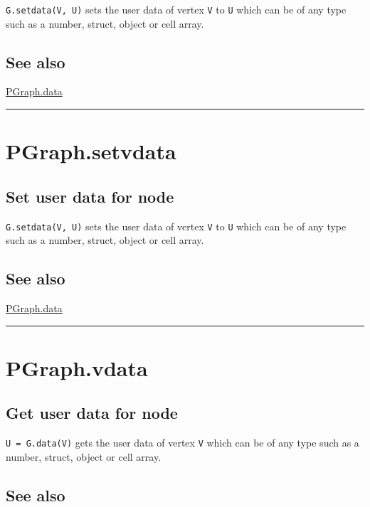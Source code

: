 \texttt{G.setdata(V, U)} sets the user data of vertex \texttt{V} to \texttt{U} which can be of any
type such as a number, struct, object or cell array.


\subsection*{See also}


\hyperlink{PGraph.data}{\color{blue} PGraph.data}

\vspace{1.5ex}\hrule

\hypertarget{PGraph.setvdata}{\section*{PGraph.setvdata}}
\subsection*{Set user data for node}


\texttt{G.setdata(V, U)} sets the user data of vertex \texttt{V} to \texttt{U} which can be of any
type such as a number, struct, object or cell array.


\subsection*{See also}


\hyperlink{PGraph.data}{\color{blue} PGraph.data}

\vspace{1.5ex}\hrule

\hypertarget{PGraph.vdata}{\section*{PGraph.vdata}}
\subsection*{Get user data for node}


\texttt{U = G.data(V)} gets the user data of vertex \texttt{V} which can be of any
type such as a number, struct, object or cell array.


\subsection*{See also}


